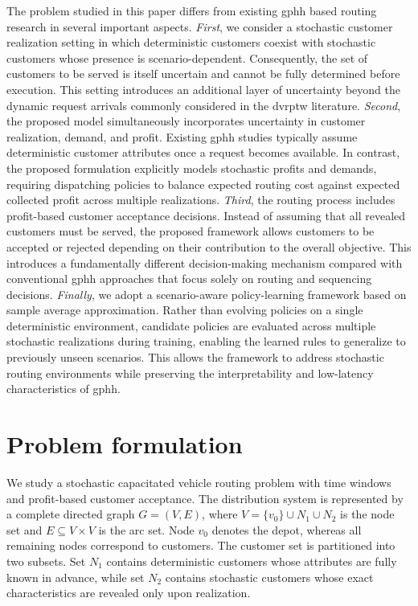 \documentclass[pdflatex]{sn-jnl}
\begin{document}
The problem studied in this paper differs from existing \gls{gphh} based routing research in several important aspects. \textit{First}, we consider a stochastic customer realization setting in which deterministic customers coexist with stochastic customers whose presence is scenario-dependent. Consequently, the set of customers to be served is itself uncertain and cannot be fully determined before execution. This setting introduces an additional layer of uncertainty beyond the dynamic request arrivals commonly considered in the \gls{dvrptw} literature. \textit{Second}, the proposed model simultaneously incorporates uncertainty in customer realization, demand, and profit. Existing \gls{gphh} studies typically assume deterministic customer attributes once a request becomes available. In contrast, the proposed formulation explicitly models stochastic profits and demands, requiring dispatching policies to balance expected routing cost against expected collected profit across multiple realizations. \textit{Third}, the routing process includes profit-based customer acceptance decisions. Instead of assuming that all revealed customers must be served, the proposed framework allows customers to be accepted or rejected depending on their contribution to the overall objective. This introduces a fundamentally different decision-making mechanism compared with conventional \gls{gphh} approaches that focus solely on routing and sequencing decisions. \textit{Finally}, we adopt a scenario-aware policy-learning framework based on sample average approximation. Rather than evolving policies on a single deterministic environment, candidate policies are evaluated across multiple stochastic realizations during training, enabling the learned rules to generalize to previously unseen scenarios. This allows the framework to address stochastic routing environments while preserving the interpretability and low-latency characteristics of \gls{gphh}.

\section{Problem formulation}

We study a stochastic capacitated vehicle routing problem with time windows and profit-based customer acceptance.
The distribution system is represented by a complete directed graph $G=(V,E)$, where
$V=\{v_0\}\cup N_1 \cup N_2$ is the node set and $E\subseteq V\times V$ is the arc set.
Node $v_0$ denotes the depot, whereas all remaining nodes correspond to customers.
The customer set is partitioned into two subsets.
Set $N_1$ contains deterministic customers whose attributes are fully known in advance, while set $N_2$ contains stochastic customers whose exact characteristics are revealed only upon realization.
\end{document}
